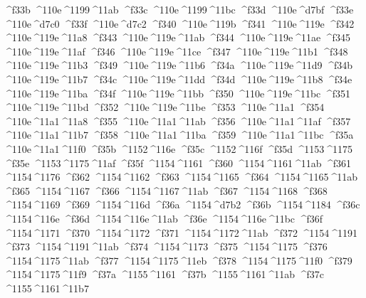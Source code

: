 \checkit ^^^^f33b ^^^^110e^^^^1199^^^^11ab
\checkit ^^^^f33c ^^^^110e^^^^1199^^^^11bc
\checkit ^^^^f33d ^^^^110e^^^^d7bf
\checkit ^^^^f33e ^^^^110e^^^^d7c0
\checkit ^^^^f33f ^^^^110e^^^^d7c2
\checkit ^^^^f340 ^^^^110e^^^^119b
\checkit ^^^^f341 ^^^^110e^^^^119e
\checkit ^^^^f342 ^^^^110e^^^^119e^^^^11a8
\checkit ^^^^f343 ^^^^110e^^^^119e^^^^11ab
\checkit ^^^^f344 ^^^^110e^^^^119e^^^^11ae
\checkit ^^^^f345 ^^^^110e^^^^119e^^^^11af
\checkit ^^^^f346 ^^^^110e^^^^119e^^^^11ce
\checkit ^^^^f347 ^^^^110e^^^^119e^^^^11b1
\checkit ^^^^f348 ^^^^110e^^^^119e^^^^11b3
\checkit ^^^^f349 ^^^^110e^^^^119e^^^^11b6
\checkit ^^^^f34a ^^^^110e^^^^119e^^^^11d9
\checkit ^^^^f34b ^^^^110e^^^^119e^^^^11b7
\checkit ^^^^f34c ^^^^110e^^^^119e^^^^11dd
\checkit ^^^^f34d ^^^^110e^^^^119e^^^^11b8
\checkit ^^^^f34e ^^^^110e^^^^119e^^^^11ba
\checkit ^^^^f34f ^^^^110e^^^^119e^^^^11bb
\checkit ^^^^f350 ^^^^110e^^^^119e^^^^11bc
\checkit ^^^^f351 ^^^^110e^^^^119e^^^^11bd
\checkit ^^^^f352 ^^^^110e^^^^119e^^^^11be
\checkit ^^^^f353 ^^^^110e^^^^11a1
\checkit ^^^^f354 ^^^^110e^^^^11a1^^^^11a8
\checkit ^^^^f355 ^^^^110e^^^^11a1^^^^11ab
\checkit ^^^^f356 ^^^^110e^^^^11a1^^^^11af
\checkit ^^^^f357 ^^^^110e^^^^11a1^^^^11b7
\checkit ^^^^f358 ^^^^110e^^^^11a1^^^^11ba
\checkit ^^^^f359 ^^^^110e^^^^11a1^^^^11bc
\checkit ^^^^f35a ^^^^110e^^^^11a1^^^^11f0
\checkit ^^^^f35b ^^^^1152^^^^116e
\checkit ^^^^f35c ^^^^1152^^^^116f
\checkit ^^^^f35d ^^^^1153^^^^1175
\checkit ^^^^f35e ^^^^1153^^^^1175^^^^11af
\checkit ^^^^f35f ^^^^1154^^^^1161
\checkit ^^^^f360 ^^^^1154^^^^1161^^^^11ab
\checkit ^^^^f361 ^^^^1154^^^^1176
\checkit ^^^^f362 ^^^^1154^^^^1162
\checkit ^^^^f363 ^^^^1154^^^^1165
\checkit ^^^^f364 ^^^^1154^^^^1165^^^^11ab
\checkit ^^^^f365 ^^^^1154^^^^1167
\checkit ^^^^f366 ^^^^1154^^^^1167^^^^11ab
\checkit ^^^^f367 ^^^^1154^^^^1168
\checkit ^^^^f368 ^^^^1154^^^^1169
\checkit ^^^^f369 ^^^^1154^^^^116d
\checkit ^^^^f36a ^^^^1154^^^^d7b2
\checkit ^^^^f36b ^^^^1154^^^^1184
\checkit ^^^^f36c ^^^^1154^^^^116e
\checkit ^^^^f36d ^^^^1154^^^^116e^^^^11ab
\checkit ^^^^f36e ^^^^1154^^^^116e^^^^11bc
\checkit ^^^^f36f ^^^^1154^^^^1171
\checkit ^^^^f370 ^^^^1154^^^^1172
\checkit ^^^^f371 ^^^^1154^^^^1172^^^^11ab
\checkit ^^^^f372 ^^^^1154^^^^1191
\checkit ^^^^f373 ^^^^1154^^^^1191^^^^11ab
\checkit ^^^^f374 ^^^^1154^^^^1173
\checkit ^^^^f375 ^^^^1154^^^^1175
\checkit ^^^^f376 ^^^^1154^^^^1175^^^^11ab
\checkit ^^^^f377 ^^^^1154^^^^1175^^^^11eb
\checkit ^^^^f378 ^^^^1154^^^^1175^^^^11f0
\checkit ^^^^f379 ^^^^1154^^^^1175^^^^11f9
\checkit ^^^^f37a ^^^^1155^^^^1161
\checkit ^^^^f37b ^^^^1155^^^^1161^^^^11ab
\checkit ^^^^f37c ^^^^1155^^^^1161^^^^11b7
